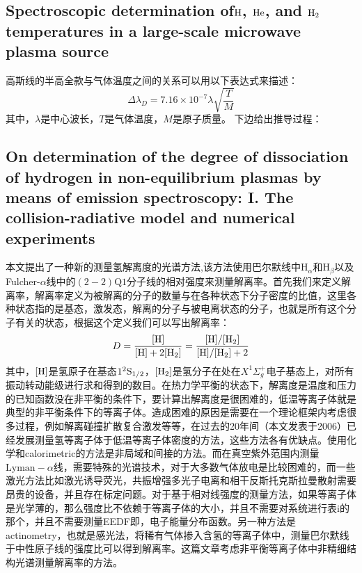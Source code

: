 \documentclass{article}
\numberwithin{equation}{subsection} %
\numberwithin{figure}{subsection} %
\numberwithin{table}{subsection} %
\begin{document}
\subsection{Spectroscopic determination of$\ce{H}$, $\ce{He}$, and $\ce{H2}$ temperatures in a large-scale microwave plasma source\cite{tatarova_spectroscopic_2007}}

高斯线的半高全款与气体温度之间的关系可以用以下表达式来描述：
\begin{equation}
    \Delta \lambda_{D} = 7.16 \times 10^{-7} \lambda \sqrt{\frac{T}{M}}
    \label{eq:gaussian_half_width_temperature_equation}
\end{equation}
其中，$\lambda$是中心波长，$T$是气体温度，$M$是原子质量。
下边给出推导过程：






\subsection{On determination of the degree of dissociation of hydrogen in non-equilibrium plasmas by means of emission spectroscopy: I. The collision-radiative model and numerical experiments\cite{lavrov_determination_2006}}
本文提出了一种新的测量氢解离度的光谱方法,该方法使用巴尔默线中$\text{H}_{\alpha}$和$\text{H}_{\beta}$以及Fulcher-$\alpha$线中的$(2-2)\text{Q1}$分子线的相对强度来测量解离率。首先我们来定义解离率，解离率定义为被解离的分子的数量与在各种状态下分子密度的比值，这里各种状态指的是基态，激发态，解离的分子与被电离状态的分子，也就是所有这个分子有关的状态，根据这个定义我们可以写出解离率：
\begin{equation}
    D = \frac{[\ce{H}]}{[\ce{H}] + 2[\ce{H2}]} = \frac{[\ce{H}]/[\ce{H2}]}{[\ce{H}]/[\ce{H2}] + 2}
\end{equation}
其中，$[\ce{H}]$是氢原子在基态$1^2\ce{S1/2}$，$[\ce{H2}]$是氢分子在处在$X^1 \Sigma^{+}_{g}$电子基态上，对所有振动转动能级进行求和得到的数目。在热力学平衡的状态下，解离度是温度和压力的已知函数没在非平衡的条件下，要计算出解离度是很困难的，低温等离子体就是典型的非平衡条件下的等离子体。造成困难的原因是需要在一个理论框架内考虑很多过程，例如解离碰撞扩散复合激发等等，在过去的20年间（本文发表于2006）已经发展测量氢等离子体于低温等离子体密度的方法，这些方法各有优缺点。使用化学和calorimetric的方法是非局域和间接的方法。而在真空紫外范围内测量$\text{Lyman}-\alpha$线，需要特殊的光谱技术，对于大多数气体放电是比较困难的，而一些激光方法比如激光诱导荧光，共振增强多光子电离和相干反斯托克斯拉曼散射需要昂贵的设备，并且存在标定问题。对于基于相对线强度的测量方法，如果等离子体是光学薄的，那么强度比不依赖于等离子体的大小，并且不需要对系统进行表i的那个，并且不需要测量EEDF即，电子能量分布函数。另一种方法是actinometry，也就是感光法，将稀有气体掺入含氢的等离子体中，测量巴尔默线于中性原子线的强度比可以得到解离率。这篇文章考虑非平衡等离子体中非精细结构光谱测量解离率的方法。
\end{document}
